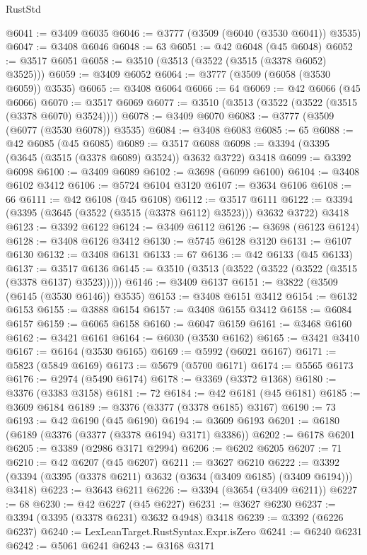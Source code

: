\begin{lexlean}{RustStd}
\begin{coremodule}
@6041 := @3409 @6035
@6046 := @3777 (@3509 (@6040 (@3530 @6041)) @3535)
@6047 := @3408 @6046
@6048 := 63
@6051 := @42 @6048 (@45 @6048)
@6052 := @3517 @6051
@6058 := @3510 (@3513 (@3522 (@3515 (@3378 @6052) @3525)))
@6059 := @3409 @6052
@6064 := @3777 (@3509 (@6058 (@3530 @6059)) @3535)
@6065 := @3408 @6064
@6066 := 64
@6069 := @42 @6066 (@45 @6066)
@6070 := @3517 @6069
@6077 := @3510 (@3513 (@3522 (@3522 (@3515 (@3378 @6070) @3524))))
@6078 := @3409 @6070
@6083 := @3777 (@3509 (@6077 (@3530 @6078)) @3535)
@6084 := @3408 @6083
@6085 := 65
@6088 := @42 @6085 (@45 @6085)
@6089 := @3517 @6088
@6098 := @3394 (@3395 (@3645 (@3515 (@3378 @6089) @3524)) @3632 @3722) @3418
@6099 := @3392 @6098
@6100 := @3409 @6089
@6102 := @3698 (@6099 @6100)
@6104 := @3408 @6102 @3412
@6106 := @5724 @6104 @3120
@6107 := @3634 @6106
@6108 := 66
@6111 := @42 @6108 (@45 @6108)
@6112 := @3517 @6111
@6122 := @3394 (@3395 (@3645 (@3522 (@3515 (@3378 @6112) @3523))) @3632 @3722) @3418
@6123 := @3392 @6122
@6124 := @3409 @6112
@6126 := @3698 (@6123 @6124)
@6128 := @3408 @6126 @3412
@6130 := @5745 @6128 @3120
@6131 := @6107 @6130
@6132 := @3408 @6131
@6133 := 67
@6136 := @42 @6133 (@45 @6133)
@6137 := @3517 @6136
@6145 := @3510 (@3513 (@3522 (@3522 (@3522 (@3515 (@3378 @6137) @3523)))))
@6146 := @3409 @6137
@6151 := @3822 (@3509 (@6145 (@3530 @6146)) @3535)
@6153 := @3408 @6151 @3412
@6154 := @6132 @6153
@6155 := @3888 @6154
@6157 := @3408 @6155 @3412
@6158 := @6084 @6157
@6159 := @6065 @6158
@6160 := @6047 @6159
@6161 := @3468 @6160
@6162 := @3421 @6161
@6164 := @6030 (@3530 @6162)
@6165 := @3421 @3410
@6167 := @6164 (@3530 @6165)
@6169 := @5992 (@6021 @6167)
@6171 := @5823 (@5849 @6169)
@6173 := @5679 (@5700 @6171)
@6174 := @5565 @6173
@6176 := @2974 (@5490 @6174)
@6178 := @3369 (@3372 @1368)
@6180 := @3376 (@3383 @3158)
@6181 := 72
@6184 := @42 @6181 (@45 @6181)
@6185 := @3609 @6184
@6189 := @3376 (@3377 (@3378 @6185) @3167)
@6190 := 73
@6193 := @42 @6190 (@45 @6190)
@6194 := @3609 @6193
@6201 := @6180 (@6189 (@3376 (@3377 (@3378 @6194) @3171) @3386))
@6202 := @6178 @6201
@6205 := @3389 (@2986 @3171 @2994)
@6206 := @6202 @6205
@6207 := 71
@6210 := @42 @6207 (@45 @6207)
@6211 := @3627 @6210
@6222 := @3392 (@3394 (@3395 (@3378 @6211) @3632 (@3634 (@3409 @6185) (@3409 @6194))) @3418)
@6223 := @3643 @6211
@6226 := @3394 (@3654 (@3409 @6211))
@6227 := 68
@6230 := @42 @6227 (@45 @6227)
@6231 := @3627 @6230
@6237 := @3394 (@3395 (@3378 @6231) @3632 @4948) @3418
@6239 := @3392 (@6226 @6237)
@6240 := LexLeanTarget.RustSyntax.Expr.isZero
@6241 := @6240 @6231
@6242 := @5061 @6241
@6243 := @3168 @3171

\end{coremodule}
\end{lexlean}
